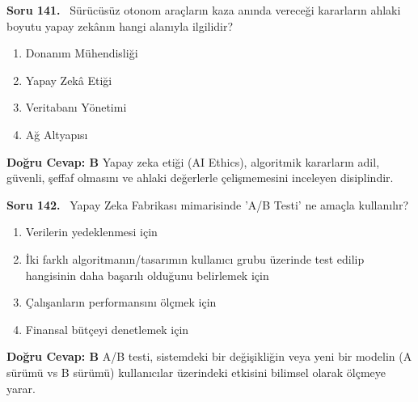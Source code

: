 \documentclass[11pt,a4paper,openany]{book}
\begin{document}
\needspace{5cm}
\vspace{8pt}
\noindent\textbf{\large\sffamily Soru 141.} \ Sürücüsüz otonom araçların kaza anında vereceği kararların ahlaki boyutu yapay zekânın hangi alanıyla ilgilidir?
\begin{enumerate}[label=\Alph*), leftmargin=25pt, topsep=4pt, itemsep=2pt]
    \item Donanım Mühendisliği
    \item Yapay Zekâ Etiği
    \item Veritabanı Yönetimi
    \item Ağ Altyapısı
\end{enumerate}
\vspace{4pt}
\begin{tcolorbox}[title=Cevap ve Açıklama, colback=gray!3!white, colframe=primarycolor!90!black, arc=2mm, fonttitle=\bfseries\sffamily, top=6pt, bottom=6pt]
    \textbf{Doğru Cevap: B}
    \vspace{2pt}
    Yapay zeka etiği (AI Ethics), algoritmik kararların adil, güvenli, şeffaf olmasını ve ahlaki değerlerle çelişmemesini inceleyen disiplindir.
\end{tcolorbox}
\vspace{10pt}

\needspace{5cm}
\vspace{8pt}
\noindent\textbf{\large\sffamily Soru 142.} \ Yapay Zeka Fabrikası mimarisinde 'A/B Testi' ne amaçla kullanılır?
\begin{enumerate}[label=\Alph*), leftmargin=25pt, topsep=4pt, itemsep=2pt]
    \item Verilerin yedeklenmesi için
    \item İki farklı algoritmanın/tasarımın kullanıcı grubu üzerinde test edilip hangisinin daha başarılı olduğunu belirlemek için
    \item Çalışanların performansını ölçmek için
    \item Finansal bütçeyi denetlemek için
\end{enumerate}
\vspace{4pt}
\begin{tcolorbox}[title=Cevap ve Açıklama, colback=gray!3!white, colframe=primarycolor!90!black, arc=2mm, fonttitle=\bfseries\sffamily, top=6pt, bottom=6pt]
    \textbf{Doğru Cevap: B}
    \vspace{2pt}
    A/B testi, sistemdeki bir değişikliğin veya yeni bir modelin (A sürümü vs B sürümü) kullanıcılar üzerindeki etkisini bilimsel olarak ölçmeye yarar.
\end{tcolorbox}
\vspace{10pt}
\end{document}
